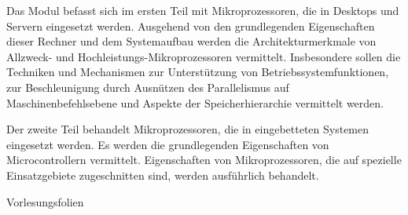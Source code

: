 \begin{course}
\begin{content}
Das Modul befasst sich im ersten Teil mit Mikroprozessoren, die in Desktops und Servern eingesetzt werden. Ausgehend von den grundlegenden Eigenschaften dieser Rechner und dem Systemaufbau werden die Architekturmerkmale von Allzweck- und Hochleistungs-Mikroprozessoren vermittelt. Insbesondere sollen die Techniken und Mechanismen zur Unterstützung von Betriebssystemfunktionen, zur Beschleunigung durch Ausnützen des Parallelismus auf Maschinenbefehlsebene und Aspekte der Speicherhierarchie vermittelt werden.

 

Der zweite Teil behandelt Mikroprozessoren, die in eingebetteten Systemen eingesetzt werden. Es werden die grundlegenden Eigenschaften von Microcontrollern vermittelt. Eigenschaften von Mikroprozessoren, die auf spezielle Einsatzgebiete zugeschnitten sind, werden ausführlich behandelt.


\end{content}

\begin{media}Vorlesungsfolien

\end{media}





\end{course}
